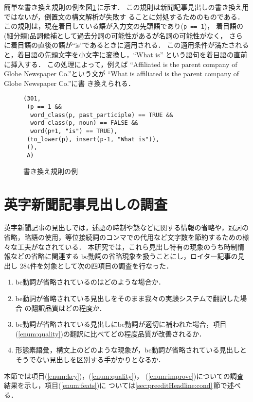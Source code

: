 簡単な書き換え規則の例を図\ref{fig:EtoE_rule}\,に示す．
この規則は新聞記事見出しの書き換え用ではないが，倒置文の構文解析が失敗す
ることに対処するためのものである．
この規則は，現在着目している語が入力文の先頭語であり(\verb+p == 1+)，
着目語の(細分類)品詞候補として過去分詞の可能性があるが名詞の可能性がなく，
さらに着目語の直後の語が``is''であるときに適用される．
この適用条件が満たされると，着目語の先頭文字を小文字に変換し，``What is''
という語句を着目語の直前に挿入する．
この処理によって，例えば
``Affiliated is the parent company of Globe Newspaper Co.''という文が
``What is affiliated is the parent company of Globe Newspaper Co.''に書
き換えられる．
\begin{figure}[tbhp]
\begin{RULE}{0.9\textwidth}
\begin{verbatim}
(301,
 (p == 1 &&
  word_class(p, past_participle) == TRUE &&
  word_class(p, noun) == FALSE &&
  word(p+1, "is") == TRUE),
 (to_lower(p), insert(p-1, "What is")),
 (),
 A)
\end{verbatim}
\end{RULE}
\caption{書き換え規則の例}
\label{fig:EtoE_rule}
\end{figure}

\section{英字新聞記事見出しの調査}
\label{sec:investigation}

英字新聞記事の見出しでは，述語の時制や態などに関する情報の省略や，冠詞の
省略，略語の使用，等位接続詞のコンマでの代用など文字数を節約するための様
々な工夫がなされている\cite{Uenoda78}．
本研究では，これら見出し特有の現象のうち時制情報などの省略に関連する
be動詞の省略現象を扱うことにし，ロイター記事\cite{Lewis97}の見出し
284件を対象として次の四項目の調査を行なった． 
\begin{enumerate}
\item
be動詞が省略されているのはどのような場合か．\label{enum:key}
\item
be動詞が省略されている見出しをそのまま我々の実験システムで翻訳した場合
の翻訳品質はどの程度か．\label{enum:quality} 
\item
be動詞が省略されている見出しにbe動詞が適切に補われた場合，項目
(\ref{enum:quality})の翻訳に比べてどの程度品質が改善されるか．
\label{enum:improve}
\item
形態素語彙，構文上のどのような現象が，be動詞が省略されている見出しと
そうでない見出しを区別する手がかりとなるか．\label{enum:feats}
\end{enumerate}
本節では項目(\ref{enum:key})，(\ref{enum:quality})，
(\ref{enum:improve})についての調査結果を示し，項目(\ref{enum:feats})に
ついては\ref{sec:preeditHeadline:cond}\,節で述べる．

